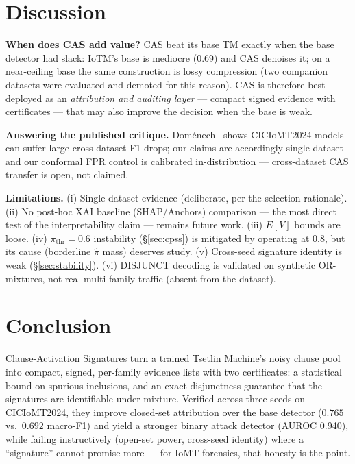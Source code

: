 \documentclass[conference]{IEEEtran}
\begin{document}
\section{Discussion}
\label{sec:discussion}
\textbf{When does CAS add value?} CAS beat its base TM exactly when the base
detector had slack: IoTM's base is mediocre (0.69) and CAS denoises it; on a
near-ceiling base the same construction is lossy compression (two companion
datasets were evaluated and demoted for this reason). CAS is therefore best
deployed as an \emph{attribution and auditing layer} --- compact signed
evidence with certificates --- that may also improve the decision when the
base is weak.

\textbf{Answering the published critique.} Dom\'enech~\cite{domenech2025}
shows CICIoMT2024 models can suffer large cross-dataset F1 drops; our claims
are accordingly single-dataset and our conformal FPR control is calibrated
in-distribution --- cross-dataset CAS transfer is open, not claimed.

\textbf{Limitations.} (i) Single-dataset evidence (deliberate, per the
selection rationale). (ii) No post-hoc XAI baseline (SHAP/Anchors)
comparison --- the most direct test of the interpretability claim ---
remains future work. (iii) $E[V]$ bounds are loose.
(iv) $\pi_{\mathrm{thr}}{=}0.6$ instability (\S\ref{sec:cpss}) is mitigated
by operating at 0.8, but its cause (borderline $\hat{\pi}$ mass) deserves
study. (v) Cross-seed signature identity is weak (\S\ref{sec:stability}).
(vi) DISJUNCT decoding is validated on synthetic OR-mixtures, not real
multi-family traffic (absent from the dataset).

\section{Conclusion}
Clause-Activation Signatures turn a trained Tsetlin Machine's noisy clause
pool into compact, signed, per-family evidence lists with two certificates:
a statistical bound on spurious inclusions, and an exact disjunctness
guarantee that the signatures are identifiable under mixture. Verified
across three seeds on CICIoMT2024, they improve closed-set attribution over
the base detector ($0.765$ vs.\ $0.692$ macro-F1) and yield a stronger
binary attack detector (AUROC 0.940), while failing instructively (open-set
power, cross-seed identity) where a ``signature'' cannot promise more ---
for IoMT forensics, that honesty is the point.
\end{document}
